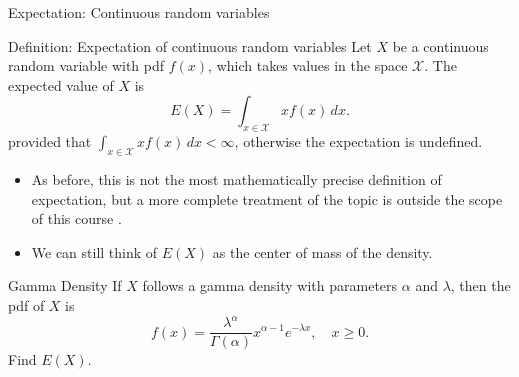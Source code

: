 \begin{frame}[allowframebreaks]{Expectation: Continuous random variables}

  \begin{block}{Definition: Expectation of continuous random variables}
    Let $X$ be a continuous random variable with pdf $f(x)$, which takes values in the space $\mathcal{X}$. The \alert{expected value} of $X$ is 
    $$
    E(X) = \int_{x\in \mathcal{X}}xf(x)\, dx.
    $$
    provided that $\int_{x\in \mathcal{X}}xf(x)\, dx < \infty$, otherwise the expectation is undefined. 
  \end{block}

 \begin{itemize}
    \item As before, this is not the most mathematically precise definition of expectation, but a more complete treatment of the topic is outside the scope of this course \citep[See][]{resnick19}.
    \item We can still think of $E(X)$ as the center of mass of the density.
  \end{itemize}

\framebreak

\begin{exampleblock}{Gamma Density}
  If $X$ follows a gamma density with parameters $\alpha$ and $\lambda$, then the pdf of $X$ is
  $$
  f(x) = \frac{\lambda^\alpha}{\Gamma(\alpha)} x^{\alpha - 1}e^{-\lambda x}, \quad x \geq 0.
  $$
  Find $E(X)$.


\end{exampleblock}
\end{frame}

